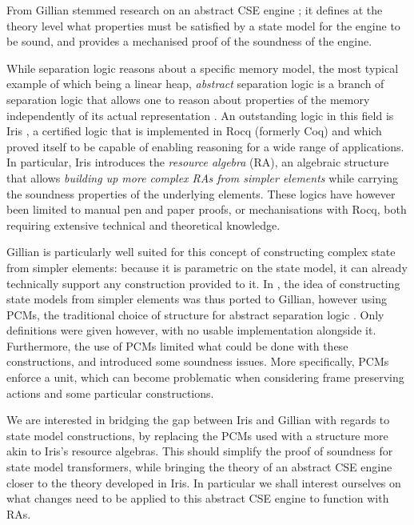 From Gillian stemmed research on an abstract CSE engine \cite{cse1,cse2}; it defines at the theory level what properties must be satisfied by a state model for the engine to be sound, and provides a mechanised proof of the soundness of the engine.

While separation logic reasons about a specific memory model, the most typical example of which being a linear heap, \emph{abstract} separation logic is a branch of separation logic that allows one to reason about properties of the memory independently of its actual representation \cite{higherorderseplogic,abstractseplogic}. An outstanding logic in this field is Iris \cite{iris}, a certified logic that is implemented in Rocq (formerly Coq) \cite{coq} and which proved itself to be capable of enabling reasoning for a wide range of applications. In particular, Iris introduces the \emph{resource algebra} (RA), an algebraic structure that allows \emph{building up more complex RAs from simpler elements} while carrying the soundness properties of the underlying elements. These logics have however been limited to manual pen and paper proofs, or mechanisations with Rocq, both requiring extensive technical and theoretical knowledge.

Gillian is particularly well suited for this concept of constructing complex state from simpler elements: because it is parametric on the state model, it can already technically support any construction provided to it. In \cite{sacha-phd}, the idea of constructing state models from simpler elements was thus ported to Gillian, however using PCMs, the traditional choice of structure for abstract separation logic \cite{abstractseplogic,sepalgebra,iris1,higherorderseplogic}. Only definitions were given however, with no usable implementation alongside it. Furthermore, the use of PCMs limited what could be done with these constructions, and introduced some soundness issues. More specifically, PCMs enforce a unit, which can become problematic when considering frame preserving actions and some particular constructions.

We are interested in bridging the gap between Iris and Gillian with regards to state model constructions, by replacing the PCMs used with a structure more akin to Iris's resource algebras. This should simplify the proof of soundness for state model transformers, while bringing the theory of an abstract CSE engine closer to the theory developed in Iris. In particular we shall interest ourselves on what changes need to be applied to this abstract CSE engine to function with RAs.

